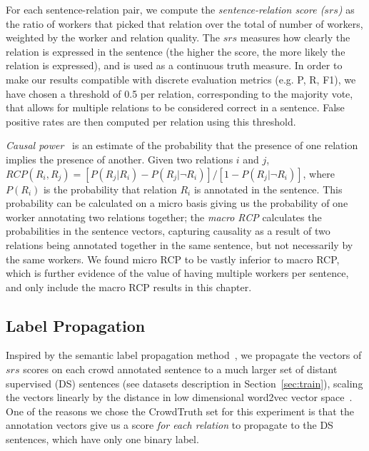 For each sentence-relation pair, we compute the \textit{sentence-relation score ($srs$)} as the ratio of workers that picked that relation over the total of number of workers, weighted by the worker and relation quality. The $srs$ measures how clearly the relation is expressed in the sentence (the higher the score, the more likely the relation is expressed), and is used as a continuous truth measure. In order to make our results compatible with discrete evaluation metrics (e.g. P, R, F1), we have chosen a threshold of 0.5 per relation, corresponding to the majority vote, that allows for multiple relations to be considered correct in a sentence.  False positive rates are then computed per relation using this threshold.

\textit{Causal power}~\cite{cheng1997causalpower} is an estimate of the probability that the presence of one relation implies the presence of another. Given two relations $i$ and $j$, $ RCP(R_i, R_j) = [ P(R_{j} | R_{i} ) - P(R_{j} | \neg R_{i} ) ] / [1 - P(R_{j} | \neg R_{i} )]$, where $P(R_{i})$ is the probability that relation $R_i$ is annotated in the sentence. This probability can be calculated on a micro basis giving us the probability of one worker annotating two relations together; the \textit{macro RCP} calculates the probabilities in the sentence vectors, capturing causality as a result of two relations being annotated together in the same sentence, but not necessarily by the same workers.  We found micro RCP to be vastly inferior to macro RCP, which is further evidence of the value of having multiple workers per sentence, and only include the macro RCP results in this chapter.


\subsection{Label Propagation}
\label{sec:label-prop}

Inspired by the semantic label propagation method~\cite{sterckx2016knowledge}, we propagate the vectors of $srs$ scores on each crowd annotated sentence to a much larger set of distant supervised (DS) sentences (see datasets description in Section~\ref{sec:train}), scaling the vectors linearly by the distance in low dimensional word2vec vector space~\cite{mikolov2013distributed}.  One of the reasons we chose the CrowdTruth set for this experiment is that the annotation vectors give us a score \emph{for each relation} to propagate to the DS sentences, which have only one binary label.

